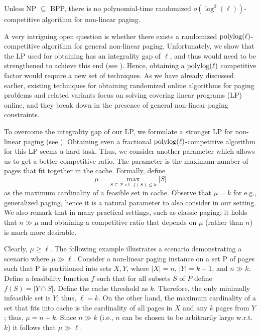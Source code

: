\documentclass[11pt]{article}
\newcommand{\cP}{{\mathcal{P}}}
\begin{document}
\begin{theorem}
	\label{thm:LB}
Unless \textnormal{NP $\subseteq $ BPP}, there is no polynomial-time randomized $o(\log^2 (\ell))$-competitive algorithm for \textnormal{non-linear paging}.
\end{theorem}

A very intriguing open question is whether there exists a randomized $\textnormal{polylog} (\ell)$-competitive algorithm for general non-linear paging. Unfortunately, we show that the LP used for obtaining  has an integrality gap of $\ell$, and thus would need to be strengthened to achieve this end (see ).  Hence, obtaining a $\textnormal{polylog} (\ell)$ competitive factor would require a new set of techniques. As we have already discussed earlier, existing techniques for obtaining randomized online algorithms for paging problems and related variants focus on solving covering linear programs (LP) online, and they break down in the presence of general non-linear paging constraints. 

To overcome the integrality gap of our LP, we formulate a stronger LP for non-linear paging (see ). Obtaining even a fractional $\textnormal{polylog}(\ell)$-competitive algorithm for this LP seems a hard task. Thus, we consider another parameter which allows us to get a better competitive ratio. The parameter is the maximum number of pages that fit together in the cache. Formally, define 
\begin{equation}
	\label{eq:mu}
	\mu = \max_{S \subseteq \cP \text{ s.t. } f(S) \leq k} |S|
\end{equation} as the maximum cardinality of a feasible set in cache. Observe that $\mu = k$ for e.g., generalized paging, hence it is a natural parameter to also consider in our setting. We also remark that in many practical settings, such as classic paging, it holds that $n \gg \mu$ and obtaining a competitive ratio that depends on $\mu$ (rather than $n$) is much more desirable. 

Clearly, $\mu \geq \ell$. The following example illustrates a scenario demonstrating a scenario where $\mu \gg \ell$. Consider a non-linear paging
instance on a set P of pages such that P is partitioned into sets $X,Y$, where $|X| = n$, $|Y| = k+1$, and $n \gg k$.
Define a feasibility function $f$ such that for all subsets $S$ of $P$ define $f(S) = |Y \cap S|$. Define the cache
threshold as $k$. Therefore, the only minimally infeasible set is $Y$; thus, $\ell = k$. On the other hand, the
maximum cardinality of a set that fits into cache is the cardinality of all pages in $X$ and any $k$ pages from
$Y$; thus, $\mu = n+k$. Since $n \gg k$ (i.e., $n$ can be chosen to be arbitrarily large w.r.t. $k$) it follows that $\mu \gg \ell$. 
\end{document}
